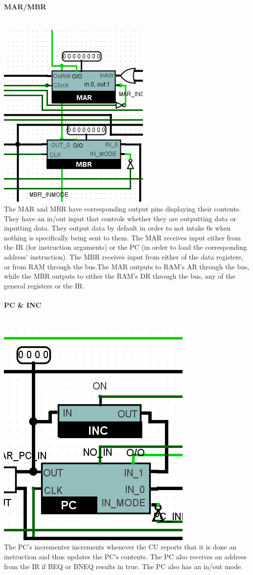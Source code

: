 \documentclass{mcgillhomework}
\begin{document}
	\paragraph{MAR/MBR}~
	\\ \includegraphics[scale=0.7]{MARMBR} \\The MAR and MBR have corresponding output pins displaying their contents. They have an in/out input that controls whether they are outputting data or inputting data. They output data by default in order to not intake 0s when nothing is specifically being sent to them. The MAR receives input either from the IR (for instruction arguments) or the PC (in order to load the corresponding address' instruction). The MBR receives input from either of the data registers, or from RAM through the bus.The MAR outputs to RAM's AR through the bus, while the MBR outputs to either the RAM's DR through the bus, any of the general registers or the IR.
	\paragraph{PC \& INC}~
	\\ \includegraphics[scale=0.5]{PC} \\ The PC's incrementer increments whenever the CU reports that it is done an instruction and thus updates the PC's contents. The PC also receives an address from the IR if BEQ or BNEQ results in true. The PC also has an in/out mode.
\end{document}
